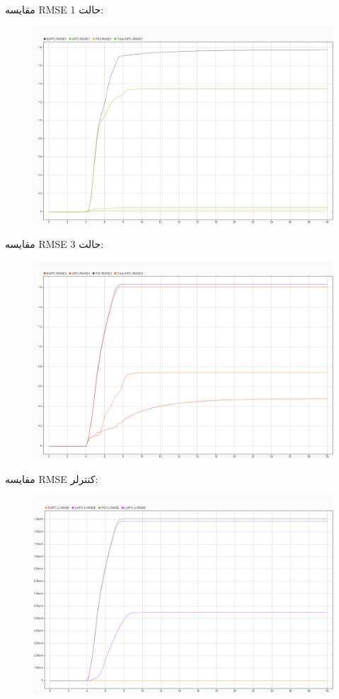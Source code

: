 مقایسه RMSE حالت 1:
\begin{figure}[H]
	\centering
	\includegraphics[width=0.7\linewidth]{../img/33}
	\caption{}
	\label{fig:33}
\end{figure}

مقایسه RMSE حالت 3:
\begin{figure}[H]
	\centering
	\includegraphics[width=0.7\linewidth]{../img/34}
	\caption{}
	\label{fig:34}
\end{figure}

مقایسه RMSE کنترلر:
\begin{figure}[H]
	\centering
	\includegraphics[width=0.7\linewidth]{../img/35}
	\caption{}
	\label{fig:35}
\end{figure}

